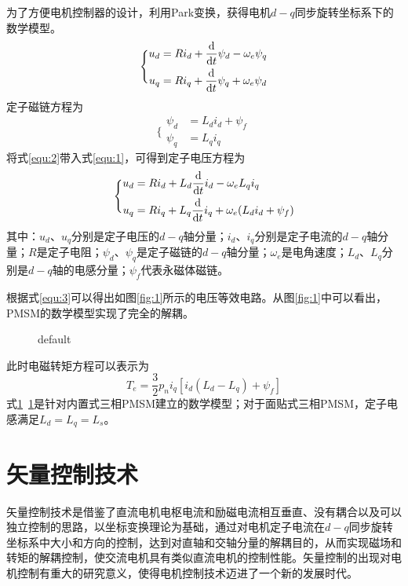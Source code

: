 为了方便电机控制器的设计，利用Park变换，获得电机$d-q$同步旋转坐标系下的数学模型。
\begin{equation}
\label{equ:1}
\Bigg\{\begin{aligned}
u_d & =Ri_d+\frac{\mathop{}\!\mathrm{d}}{{\mathop{}\!\mathrm{d}}t}\psi_d-\omega_e\psi_q \\
u_q & =Ri_q+\frac{\mathop{}\!\mathrm{d}}{{\mathop{}\!\mathrm{d}}t}\psi_q+\omega_e\psi_d 
\end{aligned}
\end{equation}
定子磁链方程为
\begin{equation}
\label{equ:2}
\Bigg\{\begin{aligned}
\psi_d & = L_di_d+\psi_f \\
\psi_q & = L_qi_q 
\end{aligned}
\end{equation}
将式\ref{equ:2}带入式\ref{equ:1}，可得到定子电压方程为
\begin{equation}
\label{equ:3}
\Bigg\{\begin{aligned}
u_d & = Ri_d+L_d\frac{\mathop{}\!\mathrm{d}}{{\mathop{}\!\mathrm{d}}t}i_d-\omega_eL_qi_q \\
u_q & = Ri_q+L_q\frac{\mathop{}\!\mathrm{d}}{{\mathop{}\!\mathrm{d}}t}i_q+\omega_e(L_di_d+\psi_f) 
\end{aligned}
\end{equation}
其中：$u_d$、$u_q$分别是定子电压的$d-q$轴分量；$i_d$、$i_q$分别是定子电流的$d-q$轴分量；$R$是定子电阻；$\psi_d$、$\psi_q$是定子磁链的$d-q$轴分量；$\omega_e$是电角速度；$L_d$、$L_q$分别是$d-q$轴的电感分量；$\psi_f$代表永磁体磁链。

根据式\ref{equ:3}可以得出如图\ref{fig:1}所示的电压等效电路。从图\ref{fig:1}中可以看出，PMSM的数学模型实现了完全的解耦。
\begin{figure}[htbp]
\centering

\caption{default}
\label{default}
\end{figure}
此时电磁转矩方程可以表示为
\begin{equation}
T_e=\frac{3}{2}p_ni_q[i_d(L_d-L_q)+\psi_f]
\end{equation}
式\ref{}~\ref{}是针对内置式三相PMSM建立的数学模型；对于面贴式三相PMSM，定子电感满足$L_d=L_q=L_s$。
\section{矢量控制技术}
矢量控制技术是借鉴了直流电机电枢电流和励磁电流相互垂直、没有耦合以及可以独立控制的思路，以坐标变换理论为基础，通过对电机定子电流在$d-q$同步旋转坐标系中大小和方向的控制，达到对直轴和交轴分量的解耦目的，从而实现磁场和转矩的解耦控制，使交流电机具有类似直流电机的控制性能。矢量控制的出现对电机控制有重大的研究意义，使得电机控制技术迈进了一个新的发展时代。

